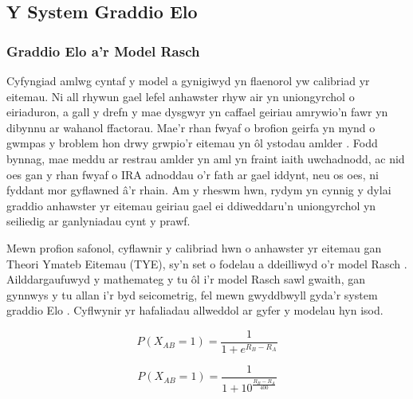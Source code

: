 \subsection{Y System Graddio Elo}
\subsubsection{Graddio Elo a'r Model Rasch}
Cyfyngiad amlwg cyntaf y model a gynigiwyd yn flaenorol yw calibriad yr eitemau. Ni all rhywun gael lefel anhawster rhyw air yn uniongyrchol o eiriaduron, a gall y drefn y mae dysgwyr yn caffael geiriau amrywio'n fawr yn dibynnu ar wahanol ffactorau. Mae'r rhan fwyaf o brofion geirfa yn mynd o gwmpas y broblem hon drwy grwpio'r eitemau yn ôl ystodau amlder \parencite{nation_teaching_1990, meara_complexities_1994, dudley_context-aligned_2024}. Fodd bynnag, mae meddu ar restrau amlder yn aml yn fraint iaith uwchadnodd, ac nid oes gan y rhan fwyaf o IRA adnoddau o'r fath ar gael iddynt, neu os oes, ni fyddant mor gyflawned â'r rhain. Am y rheswm hwn, rydym yn cynnig y dylai graddio anhawster yr eitemau geiriau gael ei ddiweddaru'n uniongyrchol yn seiliedig ar ganlyniadau cynt y prawf.

Mewn profion safonol, cyflawnir y calibriad hwn o anhawster yr eitemau gan Theori Ymateb Eitemau (TYE), sy'n set o fodelau a ddeilliwyd o'r model Rasch \parencite{rasch_probabilistic_1980}. Ailddargaufuwyd y mathemateg y tu ôl i'r model Rasch sawl gwaith, gan gynnwys y tu allan i'r byd seicometrig, fel mewn gwyddbwyll gyda'r system graddio Elo \parencite{elo_uscf_1961, elo_rating_1986}. Cyflwynir yr hafaliadau allweddol ar gyfer y modelau hyn isod.

\begin{figure}[h]
    \centering
    \begin{minipage}{0.45\textwidth}
        \centering
            \[P(X_{AB} = 1)=\frac{1}{1+e^{R_B-R_A}}\]
    \end{minipage}
    \hfill
    \begin{minipage}{0.45\textwidth}
        \centering
            \[P(X_{AB} = 1)=\frac{1}{1+10^{\frac{R_B-R_A}{400}}}\]
        \label{fig:Elo}
    \end{minipage}
\end{figure}

